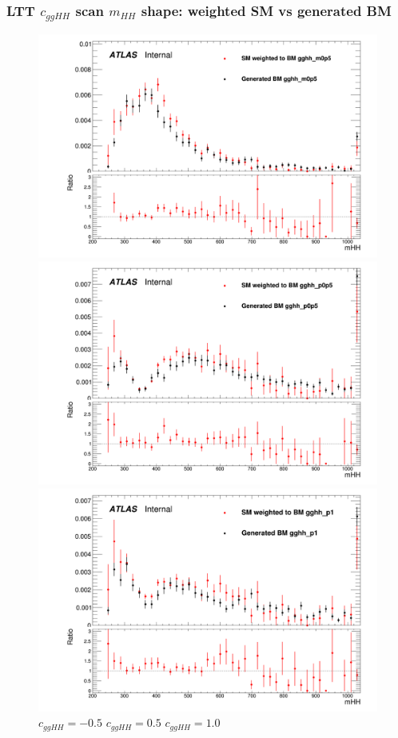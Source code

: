 \documentclass[twoside,11pt]{beamer}
\begin{document}
\begin{frame}
\frametitle{LTT $c_{ggHH}$ scan $m_{HH}$  shape: weighted SM vs generated BM}

\begin{figure}
\includegraphics[width=.32\textwidth]{figures/Method_B_all_latest_LTT/BMgghh_m0p5h_mHH.png}
\includegraphics[width=.32\textwidth]{figures/Method_B_all_latest_LTT/BMgghh_p0p5h_mHH.png}
\includegraphics[width=.32\textwidth]{figures/Method_B_all_latest_LTT/BMgghh_p1h_mHH.png}
$c_{ggHH} = -0.5$ \hspace{5em} $c_{ggHH} = 0.5$\hspace{5em} $c_{ggHH} = 1.0$
\end{figure}


\end{frame}     
\end{document}
